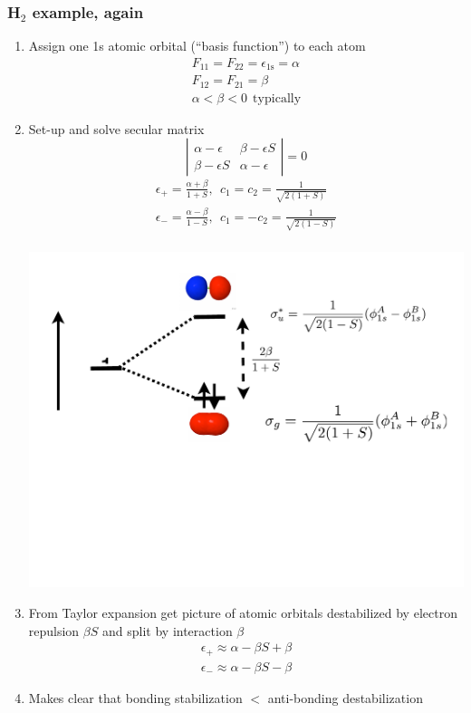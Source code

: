 \documentclass[11pt]{article}
\begin{document}
\subsubsection{H\(_2\) example, again}
\label{sec:org8926359}
\begin{enumerate}
\item Assign one 1s atomic orbital (``basis function'') to each atom
\begin{eqnarray*}
  F_{11}=F_{22}=\epsilon_{1\mathrm{s}}=\alpha \\
  F_{12}=F_{21}=\beta \\
  \alpha < \beta < 0\ \ \mathrm{typically}
\end{eqnarray*}
\item Set-up and solve secular matrix
\begin{displaymath}
 \left | \begin{array}{cc}
     \alpha-\epsilon & \beta-\epsilon S \\
     \beta - \epsilon S & \alpha-\epsilon
     \end{array} \right | = 0
\end{displaymath}
\begin{eqnarray*}
  \epsilon_+=\frac{\alpha+\beta}{1+S},\ \ c_1=c_2=\frac{1}{\sqrt{2(1+S)}} \\
  \epsilon_-=\frac{\alpha-\beta}{1-S},\ \ c_1=-c_2=\frac{1}{\sqrt{2(1-S)}} \\
\end{eqnarray*}
\begin{center}
\includegraphics[scale=0.3]{Images/H2-MO}       
\end{center}
\item From Taylor expansion get picture of atomic orbitals destabilized by electron repulsion \(\beta S\) and
split by interaction \(\beta\)
\begin{eqnarray*}
  \epsilon_+\approx \alpha-\beta S + \beta \\
  \epsilon_-\approx \alpha - \beta S - \beta
\end{eqnarray*}
\item Makes clear that bonding stabilization \(<\) anti-bonding destabilization
\end{enumerate}
\end{document}
